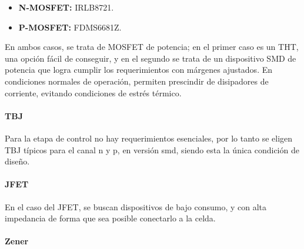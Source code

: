 \begin{itemize}
    \item \small{\textbf{N-MOSFET: } IRLB8721.}
    \item \small{\textbf{P-MOSFET: } FDMS6681Z.}
\end{itemize}

En ambos casos, se trata de MOSFET de potencia; en el primer caso es un THT, una opción fácil de conseguir, y en el segundo se trata de un dispositivo SMD de potencia que logra cumplir los requerimientos con márgenes ajustados. En condiciones normales de operación, permiten prescindir de disipadores de corriente, evitando condiciones de estrés térmico.



\paragraph{TBJ}
Para la etapa de control no hay requerimientos esenciales, por lo tanto se eligen TBJ típicos para el canal n y p, en versión smd, siendo esta la única condición  de diseño.
\paragraph{JFET}
En el caso del JFET, se buscan dispositivos de bajo consumo, y con alta impedancia de forma que sea posible conectarlo a la celda.





\paragraph{Zener}


